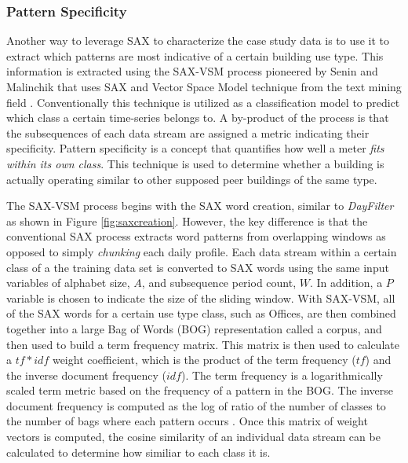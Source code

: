 \subsubsection{Pattern Specificity}
\label{sec:patternspec}

Another way to leverage SAX to characterize the case study data is to use it to extract which patterns are most indicative of a certain building use type. This information is extracted using the SAX-VSM process pioneered by Senin and Malinchik that uses SAX and Vector Space Model technique from the text mining field \cite{Senin_2013}. Conventionally this technique is utilized as a classification model to predict which class a certain time-series belongs to. A by-product of the process is that the subsequences of each data stream are assigned a metric indicating their specificity. Pattern specificity is a concept that quantifies how well a meter \emph{fits within its own class}. This technique is used to determine whether a building is actually operating similar to other supposed peer buildings of the same type.

The SAX-VSM process begins with the SAX word creation, similar to \emph{DayFilter} as shown in Figure \ref{fig:saxcreation}. However, the key difference is that the conventional SAX process extracts word patterns from overlapping windows as opposed to simply \emph{chunking} each daily profile. Each data stream within a certain class of a the training data set is converted to SAX words using the same input variables of alphabet size, $A$, and subsequence period count, $W$. In addition, a $P$ variable is chosen to indicate the size of the sliding window. With SAX-VSM, all of the SAX words for a certain use type class, such as Offices, are then combined together into a large Bag of Words (BOG) representation called a corpus, and then used to build a term frequency matrix. This matrix is then used to calculate a $tf*idf$ weight coefficient, which is the product of the term frequency ($tf$) and the inverse document frequency ($idf$). The term frequency is a logarithmically scaled term metric based on the frequency of a pattern in the BOG. The inverse document frequency is computed as the log of ratio of the number of classes to the number of bags where each pattern occurs \cite{Manning}. Once this matrix of weight vectors is computed, the cosine similarity of an individual data stream can be calculated to determine how similiar to each class it is. 